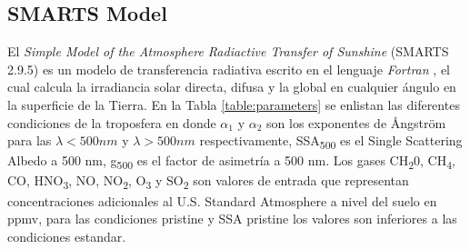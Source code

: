 \subsection{SMARTS Model}
El \textit{Simple Model of the Atmosphere Radiactive Transfer of Sunshine} (SMARTS 2.9.5) es un modelo de transferencia radiativa escrito en el lenguaje \textit{Fortran} \cite{Gueymard1995}, el cual calcula la irradiancia solar directa, difusa y la global en cualquier ángulo en la superficie de la Tierra. En la Tabla \ref{table:parameters} se enlistan las diferentes condiciones de la troposfera en donde $\alpha_1$ y $\alpha_2$ son los exponentes de \AA ngstr\"om para las $\lambda<500nm$ y $\lambda>500nm$ respectivamente, SSA\textsubscript{500} es el Single Scattering Albedo a 500 nm, g\textsubscript{500} es el factor de asimetría a 500 nm. Los gases CH\textsubscript{2}0, CH\textsubscript{4}, CO, HNO\textsubscript{3}, NO, NO\textsubscript{2}, O\textsubscript{3} y SO\textsubscript{2} son valores de entrada que representan concentraciones adicionales al U.S. Standard Atmosphere a nivel del suelo en ppmv, para las condiciones pristine y SSA pristine los valores son inferiores a las condiciones estandar. \cite{Gueymard1995}
